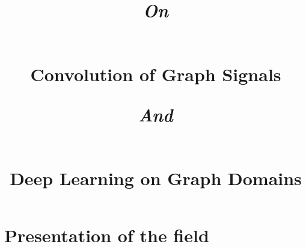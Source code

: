\documentclass[12pt]{book}
\begin{document}

%
%

\newline



%
%

\title{\begin{large}\emph{On}\end{large}\\Convolution of Graph Signals\\\begin{large}\emph{And}\end{large}\\Deep Learning on Graph Domains}
\date{}
\maketitle

%
%

%

%
%

 \dominitoc
 \tableofcontents
 \adjustmtc


%
%



%
%

  \chapter{Presentation of the field}\label{chap:1}
  \minitoc\newpage
  \newpage
\end{document}

